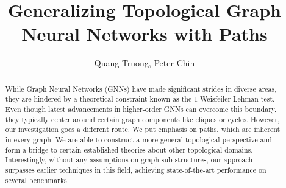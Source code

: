 \documentclass[letterpaper]{article} \usepackage{aaai24}  \usepackage{times}  \usepackage{helvet}  \usepackage{courier}  \usepackage[hyphens]{url}  \usepackage{graphicx} \urlstyle{rm} \def\UrlFont{\rm}  \usepackage{natbib}  \usepackage{caption} \frenchspacing  \setlength{\pdfpagewidth}{8.5in} \setlength{\pdfpageheight}{11in} \usepackage{algorithm}
\title{Generalizing Topological Graph Neural Networks with Paths}
\author{
    Quang Truong, Peter Chin
}
\begin{document}
\nocopyright
\maketitle

\begin{abstract}
While Graph Neural Networks (GNNs) have made significant strides in diverse areas, they are hindered by a theoretical constraint known as the 1-Weisfeiler-Lehman test. Even though latest advancements in higher-order GNNs can overcome this boundary, they typically center around certain graph components like cliques or cycles. However, our investigation goes a different route. We put emphasis on paths, which are inherent in every graph. We are able to construct a more general topological perspective and form a bridge to certain established theories about other topological domains. Interestingly, without any assumptions on graph sub-structures, our approach surpasses earlier techniques in this field, achieving state-of-the-art performance on several benchmarks.
\end{abstract}
\end{document}
